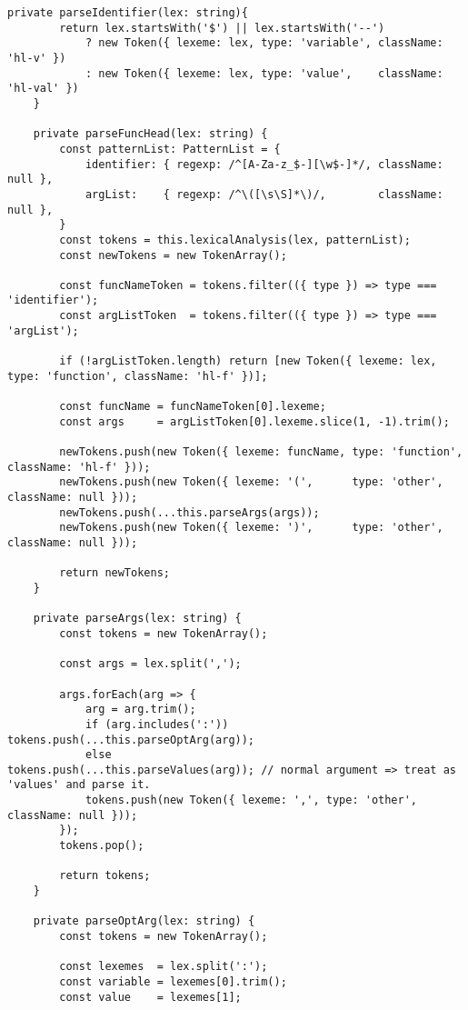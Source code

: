 \documentclass[autodetect-engine,dvi=dvipdfmx,ja=standard,
               a4j,11pt]{bxjsarticle}
\begin{document}
\begin{lstlisting}[caption={CSS/SCSSハイライタ({\tt scss.ts})(1)}, label={prog:scss1}]
    private parseIdentifier(lex: string){
        return lex.startsWith('$') || lex.startsWith('--')
            ? new Token({ lexeme: lex, type: 'variable', className: 'hl-v' })
            : new Token({ lexeme: lex, type: 'value',    className: 'hl-val' })
    }

    private parseFuncHead(lex: string) {
        const patternList: PatternList = {
            identifier: { regexp: /^[A-Za-z_$-][\w$-]*/, className: null },
            argList:    { regexp: /^\([\s\S]*\)/,        className: null },
        }
        const tokens = this.lexicalAnalysis(lex, patternList);
        const newTokens = new TokenArray();

        const funcNameToken = tokens.filter(({ type }) => type === 'identifier');
        const argListToken  = tokens.filter(({ type }) => type === 'argList');

        if (!argListToken.length) return [new Token({ lexeme: lex, type: 'function', className: 'hl-f' })];

        const funcName = funcNameToken[0].lexeme;
        const args     = argListToken[0].lexeme.slice(1, -1).trim();

        newTokens.push(new Token({ lexeme: funcName, type: 'function', className: 'hl-f' }));
        newTokens.push(new Token({ lexeme: '(',      type: 'other',    className: null }));
        newTokens.push(...this.parseArgs(args));
        newTokens.push(new Token({ lexeme: ')',      type: 'other',    className: null }));  

        return newTokens;
    }

    private parseArgs(lex: string) {
        const tokens = new TokenArray();

        const args = lex.split(',');
        
        args.forEach(arg => {
            arg = arg.trim();
            if (arg.includes(':')) tokens.push(...this.parseOptArg(arg)); 
            else                   tokens.push(...this.parseValues(arg)); // normal argument => treat as 'values' and parse it.
            tokens.push(new Token({ lexeme: ',', type: 'other', className: null }));
        });
        tokens.pop();

        return tokens;
    }

    private parseOptArg(lex: string) {
        const tokens = new TokenArray();

        const lexemes  = lex.split(':');
        const variable = lexemes[0].trim();
        const value    = lexemes[1];


\end{lstlisting}
\end{document}

